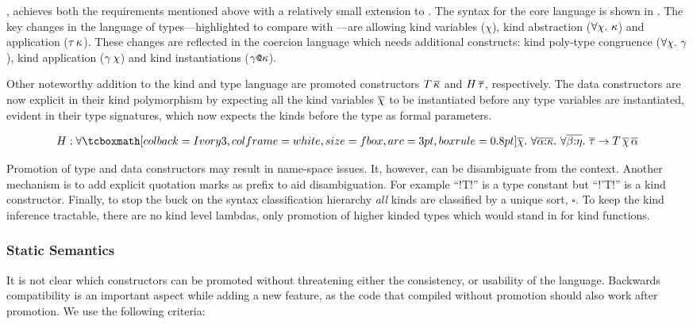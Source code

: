 \documentclass[screen,nonacm]{acmart}
\begin{document}
\SFP\cite{yorgey_giving_2012}, achieves both the requirements mentioned above with a relatively small extension to \SFC. The syntax for the core language is shown in . The key changes in the language of types---highlighted to compare with \SFC---are allowing kind variables ($\chi$), kind abstraction ($\forall\chi.~\kappa$) and application ($\tau\, \kappa$). These changes are reflected in the coercion language which needs additional constructs: kind poly-type congruence ($\forall\chi.~\gamma$), kind application ($\gamma\,\chi$) and kind instantiations ($\gamma\texttt{@}\kappa$).

Other noteworthy addition to the kind and type language are promoted constructors $T\,\overline{\kappa}$ and $H\,\overline{\tau}$, respectively. The data constructors are now explicit in their kind polymorphism by expecting all the kind variables $\overline{\chi}$ to be instantiated before any type variables are instantiated, evident in their type signatures, which now expects the kinds before the type as formal parameters.

$$
H : \Forall {\shl{\many\chi}} {\Forall {\many{\TyVar\co\kappa}}
  {\Forall {\many{\beta\co\eta}} {\many\tau \to T
      \App\many{\chi}\App\many{\TyVar}}}}
$$

Promotion of type and data constructors may result in name-space issues. It, however, can be disambiguate from the context. Another mechanism is to add explicit quotation marks as prefix to aid disambiguation.
For example ``!T!'' is a type constant but ``!'T!'' is a kind constructor.
Finally, to stop the buck on the syntax classification hierarchy \emph{all} kinds are classified by a unique sort, $\square$. To keep the kind inference tractable, there are no kind level lambdas, only promotion of higher kinded types which would stand in for kind functions.

\subsubsection{Static Semantics}
It is not clear which constructors can be promoted without threatening
either the consistency, or usability of the language. Backwards
compatibility is an important aspect while adding a new feature, as
the code that compiled without promotion should also work after
promotion. We use the following criteria:
\end{document}
